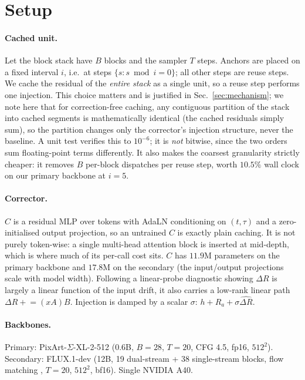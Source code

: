 \documentclass[10pt,twocolumn,letterpaper]{article}
\newcommand{\dR}{\Delta R}
\begin{document}
\section{Setup}
\label{sec:setup}

\paragraph{Cached unit.} Let the block stack have $B$ blocks and the sampler $T$
steps. Anchors are placed on a fixed interval $i$, i.e.\ at steps
$\{s : s \bmod i = 0\}$; all other steps are reuse steps. We cache the residual of
the \emph{entire stack} as a single unit, so a reuse step performs one injection.
This choice matters and is justified in Sec.~\ref{sec:mechanism}; we note here that
for correction-free caching, any contiguous partition of the stack into cached
segments is mathematically identical (the cached residuals simply sum), so the
partition changes only the corrector's injection structure, never the baseline. A unit
test verifies this to $10^{-6}$; it is \emph{not} bitwise, since the two orders sum
floating-point terms differently. It also makes the coarsest granularity strictly
cheaper: it removes $B$ per-block dispatches per reuse step, worth $10.5\%$ wall
clock on our primary backbone at $i{=}5$.

\paragraph{Corrector.} $C$ is a residual MLP over tokens with AdaLN conditioning on
$(t,\tau)$ and a zero-initialised output projection, so an untrained $C$ is exactly
plain caching. It is not purely token-wise: a single multi-head attention block is
inserted at mid-depth, which is where much of its per-call cost sits.
$C$ has $11.9$M parameters on the primary backbone and $17.8$M on the secondary
(the input/output projections scale with model width). Following a linear-probe diagnostic showing $\dR$ is largely a linear
function of the input drift, it also carries a low-rank linear path
$\dR \mathrel{+}= (xA)B$. Injection is damped by a scalar $\sigma$:
$h + R_a + \sigma \hat{\dR}$.

\paragraph{Backbones.} Primary: PixArt-$\Sigma$-XL-2-512 \cite{chen2024pixartsigma}
(0.6B, $B{=}28$, $T{=}20$, CFG 4.5, fp16, $512^2$). Secondary:
FLUX.1-dev \cite{flux2024} (12B, 19 dual-stream + 38 single-stream blocks, flow
matching \cite{lipman2023flowmatching}, $T{=}20$, $512^2$, bf16). Single NVIDIA A40.
\end{document}
